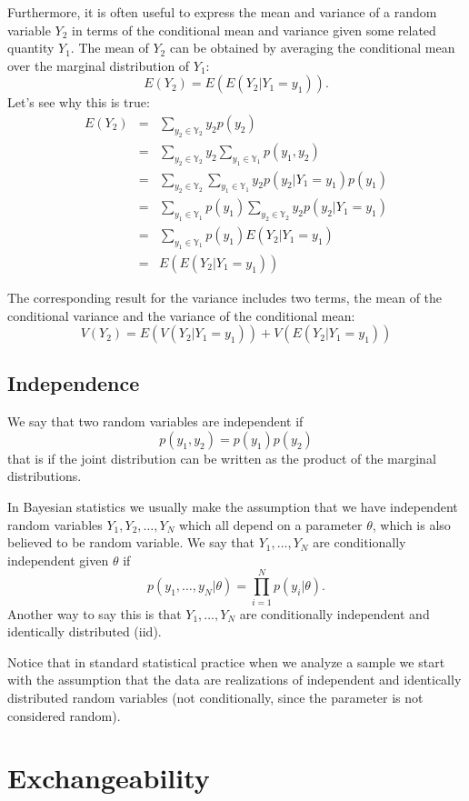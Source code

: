 \documentclass[
]{book}
\begin{document}
Furthermore, it is often useful to express the mean and variance of a random variable \(Y_2\) in terms of the conditional mean and variance given some related quantity \(Y_1\). The mean of \(Y_2\) can be obtained by averaging the conditional mean over the marginal distribution of \(Y_1\):
\[
E(Y_2)=E(E(Y_2|Y_1=y_1)).
\]
Let's see why this is true:
\begin{eqnarray*}
E(Y_2) &=&\sum_{y_2\in\mathbb{Y}_2}y_2p(y_2)\\
 &=&\sum_{y_2\in\mathbb{Y}_2}y_2\sum_{y_1\in\mathbb{Y}_1}p(y_1,y_2)\\
 &=&\sum_{y_2\in\mathbb{Y}_2}\sum_{y_1\in\mathbb{Y}_1}y_2p(y_2|Y_1=y_1)p(y_1)\\
 &=&\sum_{y_1\in\mathbb{Y}_1}p(y_1)\sum_{y_2\in\mathbb{Y}_2}y_2p(y_2|Y_1=y_1)\\
 &=&\sum_{y_1\in\mathbb{Y}_1}p(y_1)E(Y_2|Y_1=y_1)\\
 &=& E(E(Y_2|Y_1=y_1))
\end{eqnarray*}

The corresponding result for the variance includes two terms, the mean of the conditional
variance and the variance of the conditional mean:
\[
V(Y_2) = E(V(Y_2|Y_1=y_1)) + V(E(Y_2|Y_1=y_1))
\]

\hypertarget{independence}{%
\subsection{Independence}\label{independence}}

We say that two random variables are independent if
\[
p(y_1,y_2) = p(y_1)p(y_2)
\]
that is if the joint distribution can be written as the product of the marginal distributions.

In Bayesian statistics we usually make the assumption that we have independent random variables \(Y_1,Y_2,\dots,Y_N\) which all depend on a parameter \(\theta\), which is also believed to be random variable. We say that \(Y_1,\dots,Y_N\) are conditionally independent given \(\theta\) if
\[
p(y_1,\dots,y_N|\theta)=\prod_{i=1}^Np(y_i|\theta).
\]
Another way to say this is that \(Y_1,\dots,Y_N\) are conditionally independent and identically distributed (iid).

Notice that in standard statistical practice when we analyze a sample we start with the assumption that the data are realizations of independent and identically distributed random variables (not conditionally, since the parameter is not considered random).

\hypertarget{exchangeability}{%
\section{Exchangeability}\label{exchangeability}}
\end{document}
